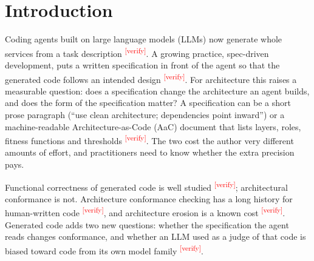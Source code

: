 \documentclass[10pt,a4paper]{article}
\newcommand{\citeneeded}[1]{\cite{#1}\textsuperscript{\textcolor{red}{\tiny[verify]}}}
\begin{document}
\begin{abstract}
A post-hoc re-reading with a later instrument version, which separates blocking dependency rules from advisory
metrics, finds no blocking violation in any of the 65 projects: the agents did not break an explicit dependency
rule at any level, and the whole specification-level effect lies in advisory metrics.
\textbf{Conclusion.} A specification changes how much structure an agent builds, and scores that reward
small structures can make that change look like a loss. At equal size, a precise AaC specification gives more
conformant code than prose. In single-shot generation of small services, the agents stay above the floor that
explicit dependency rules set, so whether a specification prevents violations has to be tested where violations
occur, such as multi-step work by an agent on a growing code base.
\end{abstract}

\section{Introduction}\label{sec:intro}

Coding agents built on large language models (LLMs) now generate whole services from a task description
\citeneeded{chen2021codex,jimenez2024swebench}. A growing practice, spec-driven development, puts a written
specification in front of the agent so that the generated code follows an intended design
\citeneeded{speckit2025,kiro2025}. For architecture this raises a measurable question: does a specification change
the architecture an agent builds, and does the form of the specification matter? A specification can be a short
prose paragraph (``use clean architecture; dependencies point inward'') or a machine-readable Architecture-as-Code
(AaC) document that lists layers, roles, fitness functions and thresholds \citeneeded{ford2017evolutionary}. The two
cost the author very different amounts of effort, and practitioners need to know whether the extra precision pays.

Functional correctness of generated code is well studied \citeneeded{chen2021codex,liu2023evalplus}; architectural
conformance is not. Architecture conformance checking has a long history for human-written code
\citeneeded{murphy1995reflexion,knodel2007comparison,passos2010static}, and architecture erosion is a known cost
\citeneeded{desilva2012erosion}. Generated code adds two new questions: whether the specification the agent reads
changes conformance, and whether an LLM used as a judge of that code is biased toward code from its own model family
\citeneeded{panickssery2024self,wataoka2024selfpref}.
\end{document}
